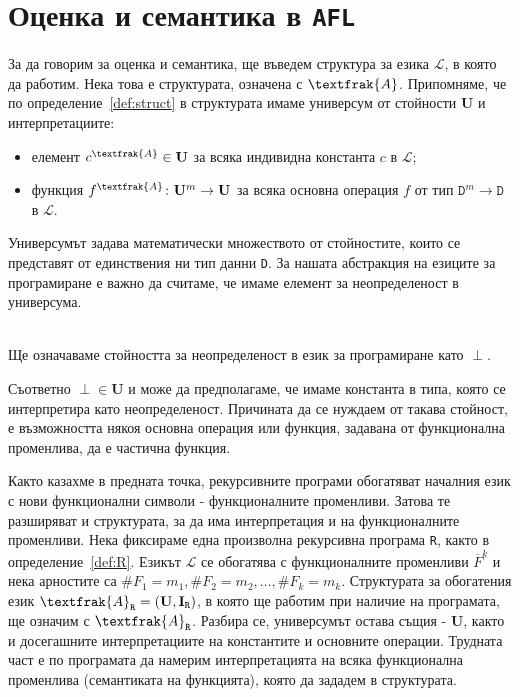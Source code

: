 \documentclass[12pt,twoside,a4paper]{article}
\begin{document}
	\section{Оценка и семантика в \texttt{AFL}}
	За да говорим за оценка и семантика, ще въведем структура за езика $\mathcal{L}$, в която да работим. Нека това е структурата, означена с $\textfrak{A}$. Припомняме, че по определение~\ref{def:struct} в структурата имаме универсум от стойности $\mathbf{U}$ и интерпретациите:
	\begin{itemize}
		\item елемент $c^\textfrak{A} \in \mathbf{U}$ за всяка индивидна константа $c$ в $\mathcal{L}$;
		\item функция $f^\textfrak{A} \colon \mathbf{U}^m \to \mathbf{U}$ за всяка основна операция $f$ от тип $\texttt{D}^{m} \to \texttt{D}$ в $\mathcal{L}$.
	\end{itemize}
	Универсумът задава математически множеството от стойностите, които се представят от единствения ни тип данни \texttt{D}. За нашата абстракция на езиците за програмиране е важно да считаме, че имаме елемент за неопределеност в универсума.
	\begin{denotation}[неопределеност]~\\
		\indent Ще означаваме стойността за неопределеност в език за програмиране като $\perp$.
	\end{denotation}
	Съответно $\perp \in \mathbf{U}$ и може да предполагаме, че имаме константа в типа, която се интерпретира като неопределеност. Причината да се нуждаем от такава стойност, е възможността някоя основна операция или функция, задавана от функционална променлива, да е частична функция.
	
	Както казахме в предната точка, рекурсивните програми обогатяват началния език с нови функционални символи - функционалните променливи. Затова те разширяват и структурата, за да има интерпретация и на функционалните променливи. Нека фиксираме една произволна рекурсивна програма \texttt{R}, както в определение~\ref{def:R}. Езикът $\mathcal{L}$ се обогатява с функционалните променливи $\overline{F}^k$ и нека арностите са $\#F_1 = m_1, \#F_2 = m_2, \dots, \#F_k = m_k$. Структурата за обогатения език $\textfrak{A}_\texttt{R}=(\mathbf{U},\mathbf{I}_\texttt{R})$, в която ще работим при наличие на програмата, ще означим с $\textfrak{A}_\texttt{R}$. Разбира се, универсумът остава същия - $\mathbf{U}$, както и досегашните интерпретациите на константите и основните операции. Трудната част е по програмата да намерим интерпретацията на всяка функционална променлива (семантиката на функцията), която да зададем в структурата.
	
\end{document}
